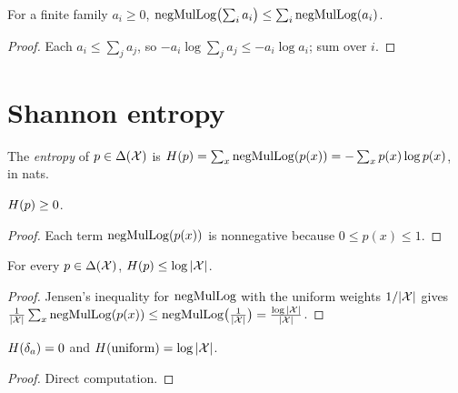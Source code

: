 \begin{lemma}
  \label{lem:negMulLog_sum_le}
  \leanok
  For a finite family $a_i \ge 0$, $\operatorname{negMulLog}\bigl(\sum_i a_i\bigr) \le \sum_i \operatorname{negMulLog}(a_i)$.
\end{lemma}
\begin{proof}
  \leanok
  Each $a_i \le \sum_j a_j$, so $-a_i \log \sum_j a_j \le -a_i \log a_i$; sum over $i$.
\end{proof}

\section{Shannon entropy}

\begin{definition}[Entropy]
  \label{def:entropy}
  \leanok
  The \emph{entropy} of $p \in \Delta(\mathcal X)$ is $H(p) = \sum_{x} \operatorname{negMulLog}(p(x)) = -\sum_x p(x) \log p(x)$,
  in nats.
\end{definition}

\begin{lemma}
  \label{lem:entropy_nonneg}
  \leanok
  $H(p) \ge 0$.
\end{lemma}
\begin{proof}
  \leanok
  Each term $\operatorname{negMulLog}(p(x))$ is nonnegative because $0 \le p(x) \le 1$.
\end{proof}

\begin{theorem}
  \label{thm:entropy_le_log_card}
  \leanok
  For every $p \in \Delta(\mathcal X)$, $H(p) \le \log |\mathcal X|$.
\end{theorem}
\begin{proof}
  \leanok
  Jensen's inequality for $\operatorname{negMulLog}$ with the uniform weights $1/|\mathcal X|$ gives
  $\frac1{|\mathcal X|}\sum_x \operatorname{negMulLog}(p(x)) \le \operatorname{negMulLog}\bigl(\frac1{|\mathcal X|}\bigr) = \frac{\log|\mathcal X|}{|\mathcal X|}$.
\end{proof}

\begin{lemma}
  \label{lem:entropy_pure_uniform}
  \leanok
  $H(\delta_a) = 0$ and $H(\mathrm{uniform}) = \log|\mathcal X|$.
\end{lemma}
\begin{proof}
  \leanok
  Direct computation.
\end{proof}

